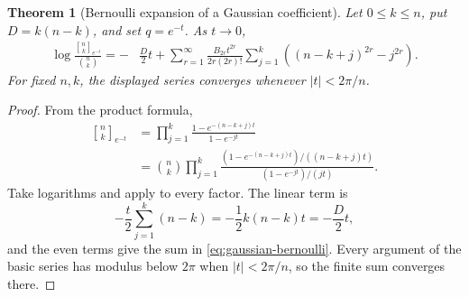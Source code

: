 \documentclass[11pt,oneside,openany]{book}
\newtheorem{theorem}{Theorem}[chapter]
\theoremstyle{definition}
\theoremstyle{remark}
\newcommand{\Qbinom}[3]{\genfrac{[}{]}{0pt}{}{#1}{#2}_{#3}}
\newcommand{\abs}[1]{\lvert #1\rvert}
\begin{document}
\begin{theorem}[Bernoulli expansion of a Gaussian coefficient]\label{thm:gaussian-bernoulli}
Let $0\le k\le n$, put $D=k(n-k)$, and set $q=e^{-t}$.  As $t\to0$,
\begin{align}
 \log\frac{\Qbinom nk{e^{-t}}}{\binom nk}
 =-&\frac D2t
 +\sum_{r=1}^{\infty}
 \frac{B_{2r}t^{2r}}{2r(2r)!}
 \sum_{j=1}^{k}
 \left((n-k+j)^{2r}-j^{2r}\right).
 \tag{19.2}\label{eq:gaussian-bernoulli}
\end{align}
For fixed $n,k$, the displayed series converges whenever $\abs t<2\pi/n$.
\end{theorem}

\begin{proof}
From the product formula,
\begin{align*}
 \Qbinom nk{e^{-t}}
 &=\prod_{j=1}^{k}
 \frac{1-e^{-(n-k+j)t}}{1-e^{-jt}}\\
 &=\binom nk
 \prod_{j=1}^{k}
 \frac{(1-e^{-(n-k+j)t})/((n-k+j)t)}
      {(1-e^{-jt})/(jt)}.
\end{align*}
Take logarithms and apply  to every factor.  The linear term is
\[
 -\frac t2\sum_{j=1}^{k}(n-k)=-\frac12k(n-k)t=-\frac D2t,
\]
and the even terms give the sum in \eqref{eq:gaussian-bernoulli}.  Every argument of the basic series has modulus below $2\pi$ when $\abs t<2\pi/n$, so the finite sum converges there.
\end{proof}
\end{document}
